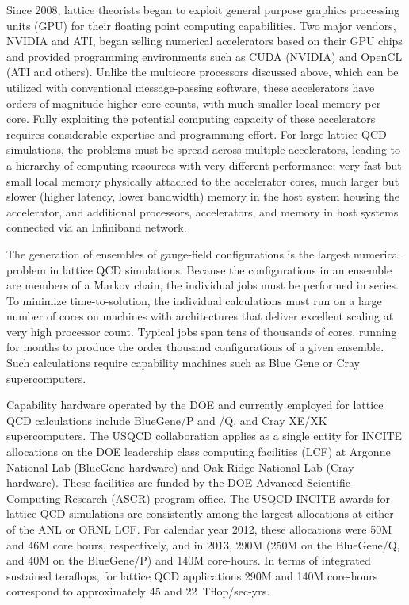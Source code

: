 Since 2008, lattice theorists began to exploit general purpose graphics
processing units (GPU) for their floating point computing capabilities.  Two
major vendors, NVIDIA and ATI, began selling numerical accelerators based on
their GPU chips and provided programming environments such as CUDA (NVIDIA)
and OpenCL (ATI and others).  Unlike the multicore processors discussed above,
which can be utilized with conventional message-passing software, these
accelerators have orders of magnitude higher core counts, with much smaller
local memory per core.  Fully exploiting the potential computing capacity of
these accelerators requires considerable expertise and programming effort.
For large lattice QCD simulations, the problems must be spread across multiple
accelerators, leading to a hierarchy of computing resources with very
different performance: very fast but small local memory physically attached to
the accelerator cores, much larger but slower (higher latency, lower
bandwidth) memory in the host system housing the accelerator, and additional
processors, accelerators, and memory in host systems connected via an
Infiniband network.

The generation of ensembles of gauge-field configurations is the largest
numerical problem in lattice QCD simulations.  Because the configurations in an
ensemble are members of a Markov chain, the individual jobs must be performed
in series.  To minimize time-to-solution, the individual calculations must run
on a large number of cores on machines with architectures that deliver
excellent scaling at very high processor count.  Typical jobs span tens of
thousands of cores, running for months to produce the order thousand
configurations of a given ensemble.  Such calculations require capability
machines such as Blue Gene or Cray supercomputers.

Capability hardware operated by the DOE and currently employed for lattice QCD
calculations include BlueGene/P and /Q, and Cray XE/XK supercomputers.  The
USQCD collaboration applies as a single entity for INCITE allocations on the
DOE leadership class computing facilities (LCF) at Argonne National Lab
(BlueGene hardware) and Oak Ridge National Lab (Cray hardware).  These
facilities are funded by the DOE Advanced Scientific Computing Research (ASCR)
program office.  The USQCD INCITE awards for lattice QCD simulations are
consistently among the largest allocations at either of the ANL or ORNL LCF.
For calendar year 2012, these allocations were 50M and 46M core hours,
respectively, and in 2013, 290M (250M on the BlueGene/Q, and 40M on the
BlueGene/P) and 140M core-hours.  In terms of integrated sustained teraflops,
for lattice QCD applications 290M and 140M core-hours correspond to
approximately 45 and 22~Tflop/sec-yrs.

